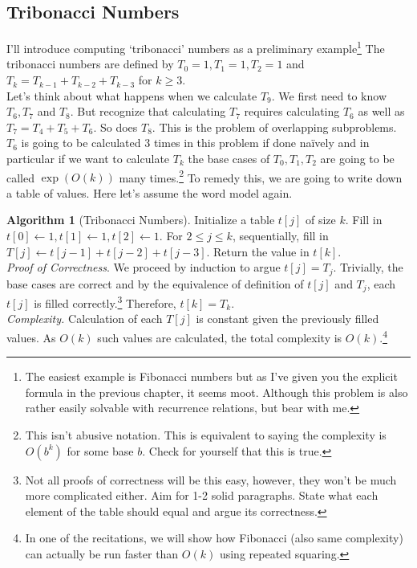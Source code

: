 \documentclass[10pt]{article}
\theoremstyle{plain}
\theoremstyle{definition}
\newtheorem{alg}[thm]{Algorithm}
\numberwithin{equation}{section}
\numberwithin{figure}{section}
\begin{document}
\subsection{Tribonacci Numbers}
\noindent I'll introduce computing `tribonacci' numbers as a preliminary example\footnote{The easiest example is Fibonacci numbers but as I've given you the explicit formula in the previous chapter, it seems moot. Although this problem is also rather easily solvable with recurrence relations, but bear with me.} The tribonacci numbers are defined by $T_0 = 1, T_1 = 1, T_2 = 1$ and $T_k = T_{k -1} + T_{k-2} + T_{k - 3}$ for $k \geq 3$. \\

\noindent Let's think about what happens when we calculate $T_9$. We first need to know $T_6, T_7$ and $T_8$. But recognize that calculating $T_7$ requires calculating $T_6$ as well as $T_7 = T_4 + T_5 + T_6$. So does $T_8$. This is the problem of overlapping subproblems. $T_6$ is going to be calculated 3 times in this problem if done na\"ively and in particular if we want to calculate $T_k$ the base cases of $T_0, T_1, T_2$ are going to be called $\exp(O(k))$ many times.\footnote{This isn't abusive notation. This is equivalent to saying the complexity is $O(b^k)$ for some base $b$. Check for yourself that this is true.} To remedy this, we are going to write down a table of values. Here let's assume the word model again.

\begin{alg}[Tribonacci Numbers]
Initialize a table $t[j]$ of size $k$. Fill in $t[0] \leftarrow 1, t[1] \leftarrow 1, t[2] \leftarrow 1$. For $2 \leq j \leq k$, sequentially, fill in $T[j] \leftarrow t[j-1] + t[j-2] + t[j-3]$. Return the value in $t[k]$. \\

\noindent \textit{Proof of Correctness}. We proceed by induction to argue $t[j] = T_j$. Trivially, the base cases are correct and by the equivalence of definition of $t[j]$ and $T_j$, each $t[j]$ is filled correctly.\footnote{Not all proofs of correctness will be this easy, however, they won't be much more complicated either. Aim for 1-2 solid paragraphs. State what each element of the table should equal and argue its correctness.} Therefore, $t[k] = T_k$. \\

\noindent \textit{Complexity.} Calculation of each $T[j]$ is constant given the previously filled values. As $O(k)$ such values are calculated, the total complexity is $O(k)$.\footnote{In one of the recitations, we will show how Fibonacci (also same complexity) can actually be run faster than $O(k)$ using repeated squaring.}
\end{alg}
\end{document}
